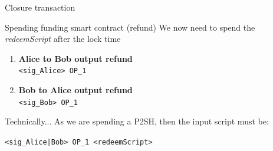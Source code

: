 \documentclass{beamer}
\begin{document}
\begin{frame}{Closure transaction}
 \begin{exampleblock}{Spending funding smart contract (refund)}
  We now need to spend the \textit{redeemScript} after the lock time
  \begin{center}
   \begin{enumerate}
    \item \textbf{Alice to Bob output refund}\\
          \texttt{<sig\_Alice> OP\_1}
    \item \textbf{Bob to Alice output refund}\\
          \texttt{<sig\_Bob> OP\_1}
   \end{enumerate}
  \end{center}
 \end{exampleblock}
 \begin{exampleblock}{Technically...}
  As we are spending a P2SH, then the input script must be:\
  \begin{center}
   \texttt{<sig\_Alice|Bob> OP\_1 <redeemScript>}
  \end{center}
 \end{exampleblock}
\end{frame}
\end{document}

